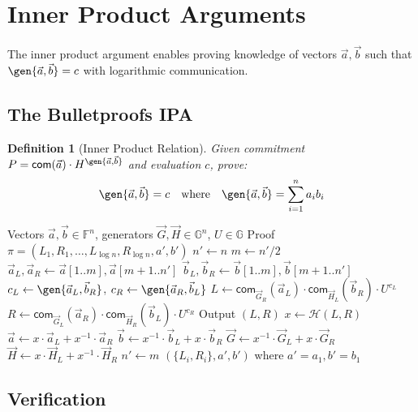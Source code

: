 \documentclass[11pt,a4paper]{article}
\newtheorem{definition}[theorem]{Definition}
\newcommand{\F}{\mathbb{F}}
\newcommand{\G}{\mathbb{G}}
\newcommand{\com}{\mathsf{com}}
\begin{document}
\section{Inner Product Arguments}
\label{sec:ipa}

The inner product argument enables proving knowledge of vectors $\vec{a}, \vec{b}$ such that $\gen{\vec{a}, \vec{b}} = c$ with logarithmic communication.

\subsection{The Bulletproofs IPA}

\begin{definition}[Inner Product Relation]
Given commitment $P = \com(\vec{a}) \cdot H^{\gen{\vec{a}, \vec{b}}}$ and evaluation $c$, prove:
\[
\gen{\vec{a}, \vec{b}} = c \quad \text{where} \quad \gen{\vec{a}, \vec{b}} = \sum_{i=1}^n a_i b_i
\]
\end{definition}

\begin{algorithm}
\caption{Inner Product Argument (Prover)}
\label{alg:ipa-prover}
\begin{algorithmic}[1]
\Require Vectors $\vec{a}, \vec{b} \in \F^n$, generators $\vec{G}, \vec{H} \in \G^n$, $U \in \G$
\Ensure Proof $\pi = (L_1, R_1, \ldots, L_{\log n}, R_{\log n}, a', b')$
\State $n' \gets n$
    \State $m \gets n'/2$
    \State $\vec{a}_L, \vec{a}_R \gets \vec{a}[1..m], \vec{a}[m+1..n']$
    \State $\vec{b}_L, \vec{b}_R \gets \vec{b}[1..m], \vec{b}[m+1..n']$
    \State $c_L \gets \gen{\vec{a}_L, \vec{b}_R}$, $c_R \gets \gen{\vec{a}_R, \vec{b}_L}$
    \State $L \gets \com_{\vec{G}_R}(\vec{a}_L) \cdot \com_{\vec{H}_L}(\vec{b}_R) \cdot U^{c_L}$
    \State $R \gets \com_{\vec{G}_L}(\vec{a}_R) \cdot \com_{\vec{H}_R}(\vec{b}_L) \cdot U^{c_R}$
    \State Output $(L, R)$
    \State $x \gets \mathcal{H}(L, R)$ 
    \State $\vec{a} \gets x \cdot \vec{a}_L + x^{-1} \cdot \vec{a}_R$
    \State $\vec{b} \gets x^{-1} \cdot \vec{b}_L + x \cdot \vec{b}_R$
    \State $\vec{G} \gets x^{-1} \cdot \vec{G}_L + x \cdot \vec{G}_R$ 
    \State $\vec{H} \gets x \cdot \vec{H}_L + x^{-1} \cdot \vec{H}_R$
    \State $n' \gets m$
\EndWhile
\State \Return $(\{L_i, R_i\}, a', b')$ where $a' = a_1, b' = b_1$
\end{algorithmic}
\end{algorithm}

\subsection{Verification}
\end{document}
